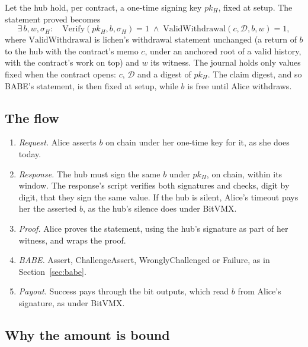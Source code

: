 \documentclass[11pt]{article}
\begin{document}
Let the hub hold, per contract, a one-time signing key $pk_H$, fixed at
setup. The statement proved becomes
\[
  \exists\, b, w, \sigma_H:\quad
  \mathrm{Verify}(pk_H, b, \sigma_H) = 1 \;\wedge\;
  \mathrm{ValidWithdrawal}(c, \mathcal{D}, b, w) = 1,
\]
where $\mathrm{ValidWithdrawal}$ is lichen's withdrawal statement
unchanged (a return of $b$ to the hub with the contract's memo $c$, under
an anchored root of a valid history, with the contract's work on top)
and $w$ its witness. The journal holds only values fixed when the
contract opens: $c$, $\mathcal{D}$ and a digest of $pk_H$. The claim digest, and
so BABE's statement, is then fixed at setup, while $b$ is free until
Alice withdraws.

\subsection{The flow}

\begin{enumerate}[leftmargin=1.5em]
\item \emph{Request.} Alice asserts $b$ on chain under her one-time key
  for it, as she does today.
\item \emph{Response.} The hub must sign the same $b$ under $pk_H$, on
  chain, within its window. The response's script verifies both
  signatures and checks, digit by digit, that they sign the same value.
  If the hub is silent, Alice's timeout pays her the asserted $b$, as
  the hub's silence does under BitVMX.
\item \emph{Proof.} Alice proves the statement, using the hub's
  signature as part of her witness, and wraps the proof.
\item \emph{BABE.} Assert, ChallengeAssert, WronglyChallenged or
  Failure, as in Section~\ref{sec:babe}.
\item \emph{Payout.} Success pays through the bit outputs, which read
  $b$ from Alice's signature, as under BitVMX.
\end{enumerate}

\subsection{Why the amount is bound}
\label{sec:binding}
\end{document}

